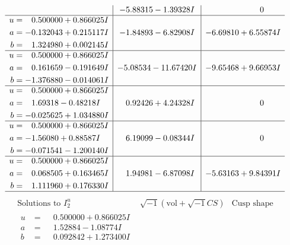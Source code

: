 \documentclass[1p]{elsarticle_modified}
\theoremstyle{definition}
\newcommand{\I}{\sqrt{-1}}
\begin{document}
$$\begin{array}{c|c|c}
 & -5.88315 - 1.39328 I & \phantom{-0.000000 } 0 \\ \hline\begin{aligned}
u &= \phantom{-}0.500000 + 0.866025 I \\
a &= -0.132043 + 0.215117 I \\
b &= \phantom{-}1.324980 + 0.002145 I\end{aligned}
 & -1.84893 - 6.82908 I & -6.69810 + 6.55874 I \\ \hline\begin{aligned}
u &= \phantom{-}0.500000 + 0.866025 I \\
a &= \phantom{-}0.161659 - 0.191649 I \\
b &= -1.376880 - 0.014061 I\end{aligned}
 & -5.08534 - 11.67420 I & -9.65468 + 9.66953 I \\ \hline\begin{aligned}
u &= \phantom{-}0.500000 + 0.866025 I \\
a &= \phantom{-}1.69318 - 0.48218 I \\
b &= -0.025625 + 1.034880 I\end{aligned}
 & \phantom{-}0.92426 + 4.24328 I & \phantom{-0.000000 } 0 \\ \hline\begin{aligned}
u &= \phantom{-}0.500000 + 0.866025 I \\
a &= -1.56080 + 0.88587 I \\
b &= -0.071541 - 1.200140 I\end{aligned}
 & \phantom{-}6.19099 - 0.08344 I & \phantom{-0.000000 } 0 \\ \hline\begin{aligned}
u &= \phantom{-}0.500000 + 0.866025 I \\
a &= \phantom{-}0.068505 + 0.163465 I \\
b &= \phantom{-}1.111960 + 0.176330 I\end{aligned}
 & \phantom{-}1.94981 - 6.87098 I & -5.63163 + 9.84391 I\\
 \hline 
 \end{array}$$\newpage$$\begin{array}{c|c|c}  
\text{Solutions to }I^u_{2}& \I (\text{vol} + \sqrt{-1}CS) & \text{Cusp shape}\\
 \hline 
\begin{aligned}
u &= \phantom{-}0.500000 + 0.866025 I \\
a &= \phantom{-}1.52884 - 1.08774 I \\
b &= \phantom{-}0.092842 + 1.273400 I\end{aligned}

\end{array}$$
\end{document}

